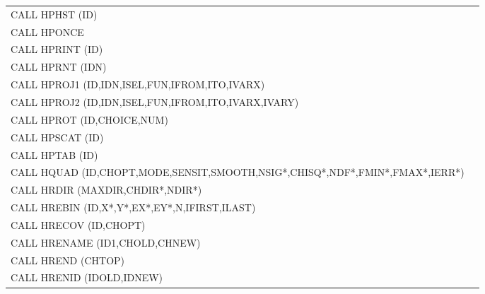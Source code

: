 \begin{longtable}{|>{\ttfamily\small}p{.9\linewidth}r|}
CALL     HPHST  (ID)                         
&                                                       \pageref{HPHST}  \\
CALL     HPONCE                              
&                                                       \pageref{HPONCE} \\
CALL     HPRINT (ID)                         
&                                                       \pageref{HPRINT} \\
CALL     HPRNT (IDN)                         
&                                                       \pageref{HPRNT}  \\
CALL     HPROJ1 (ID,IDN,ISEL,FUN,IFROM,ITO,IVARX)
&                                                       \pageref{HPROJ1} \\
CALL     HPROJ2 (ID,IDN,ISEL,FUN,IFROM,ITO,IVARX,IVARY)
&                                                       \pageref{HPROJ2} \\
CALL     HPROT  (ID,CHOICE,NUM)              
&                                                       \pageref{HPROT}  \\
CALL     HPSCAT (ID)                         
&                                                       \pageref{HPSCAT} \\
CALL     HPTAB  (ID)                         
&                                                       \pageref{HPTAB}  \\
CALL     HQUAD  (ID,CHOPT,MODE,SENSIT,SMOOTH,NSIG*,CHISQ*,NDF*,FMIN*,FMAX*,IERR*)
&                                                       \pageref{HQUAD}  \\
CALL     HRDIR  (MAXDIR,CHDIR*,NDIR*)        
&                                                       \pageref{HRDIR}  \\
CALL     HREBIN (ID,X*,Y*,EX*,EY*,N,IFIRST,ILAST)
&                                                       \pageref{HREBIN} \\
CALL     HRECOV (ID,CHOPT)
&                                                       \pageref{HRECOV} \\
CALL     HRENAME (ID1,CHOLD,CHNEW)
&                                                       \pageref{HRENAME}\\
CALL     HREND  (CHTOP)                      
&                                                       \pageref{HREND}  \\
CALL     HRENID (IDOLD,IDNEW)
&                                                       \pageref{HRENID} \\

\end{longtable}
